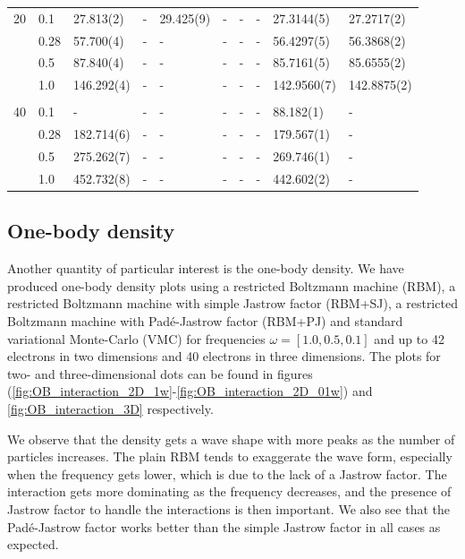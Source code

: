 {\begin{landscape}
\begin{table}
\begin{tabularx}{\hsize}{llR{2.3cm}R{2.3cm}R{2.3cm}R{2.3cm}R{2.3cm}R{2.3cm}R{2.3cm}R{2.3cm}}
		20 & 0.1 & 27.813(2) & - & 29.425(9) & - & - & - & 27.3144(5) & 27.2717(2) \\ 
		& 0.28 & 57.700(4) & - & - & - & - & - & 56.4297(5) & 56.3868(2) \\
		& 0.5 & 87.840(4) & - & - & - & - & - & 85.7161(5) & 85.6555(2) \\
		& 1.0 & 146.292(4) & - & - & - & - & - & 142.9560(7) & 142.8875(2) \\ \hdashline \\
		
		40 & 0.1 & - & - & - & - & - & - & 88.182(1) & - \\ 
		& 0.28 & 182.714(6) & - & - & - & - & - & 179.567(1) & - \\
		& 0.5 & 275.262(7) & - & - & - & - & - & 269.746(1) & - \\
		& 1.0 & 452.732(8) & - & - & - & - & - & 442.602(2) & - \\ \hline\hline
	\end{tabularx}
\end{table}
\end{landscape}
}

\subsection{One-body density}
Another quantity of particular interest is the one-body density. We have produced one-body density plots using a restricted Boltzmann machine (RBM), a restricted Boltzmann machine with simple Jastrow factor (RBM+SJ), a restricted Boltzmann machine with Padé-Jastrow factor (RBM+PJ) and standard variational Monte-Carlo (VMC) for frequencies $\omega=[1.0,0.5,0.1]$ and up to 42 electrons in two dimensions and 40 electrons in three dimensions. The plots for two- and three-dimensional dots can be found in figures (\ref{fig:OB_interaction_2D_1w}-\ref{fig:OB_interaction_2D_01w}) and \ref{fig:OB_interaction_3D} respectively.

We observe that the density gets a wave shape with more peaks as the number of particles increases. The plain RBM tends to exaggerate the wave form, especially when the frequency gets lower, which is due to the lack of a Jastrow factor. The interaction gets more dominating as the frequency decreases, and the presence of Jastrow factor to handle the interactions is then important. We also see that the Padé-Jastrow factor works better than the simple Jastrow factor in all cases as expected.

